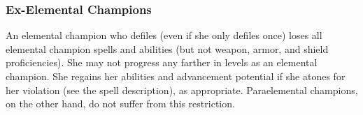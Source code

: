 {\subsubsection{Ex-Elemental Champions}
An elemental champion who defiles (even if she only defiles once) loses all elemental champion spells and abilities (but not weapon, armor, and shield proficiencies). She may not progress any farther in levels as an elemental champion. She regains her abilities and advancement potential if she atones for her violation (see the  spell description), as appropriate. Paraelemental champions, on the other hand, do not suffer from this restriction.
}
